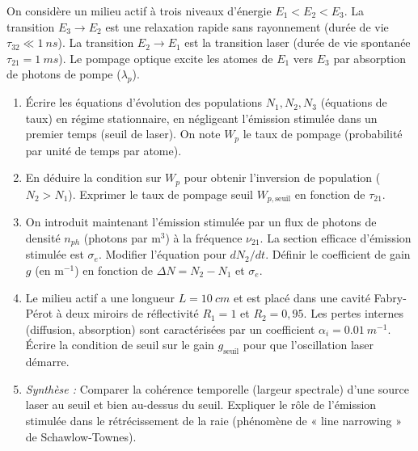 \documentclass[11pt]{article}
\begin{document}
\begin{exercice}
On considère un milieu actif à trois niveaux d'énergie $E_1 < E_2 < E_3$. La transition $E_3 \to E_2$ est une relaxation rapide sans rayonnement (durée de vie $\tau_{32} \ll \SI{1}{ns}$). La transition $E_2 \to E_1$ est la transition laser (durée de vie spontanée $\tau_{21} = \SI{1}{ms}$). Le pompage optique excite les atomes de $E_1$ vers $E_3$ par absorption de photons de pompe ($\lambda_p$).
\begin{enumerate}
    \item Écrire les équations d'évolution des populations $N_1, N_2, N_3$ (équations de taux) en régime stationnaire, en négligeant l'émission stimulée dans un premier temps (seuil de laser). On note $W_p$ le taux de pompage (probabilité par unité de temps par atome).
    \item En déduire la condition sur $W_p$ pour obtenir l'inversion de population ($N_2 > N_1$). Exprimer le taux de pompage seuil $W_{p,\text{seuil}}$ en fonction de $\tau_{21}$.
    \item On introduit maintenant l'émission stimulée par un flux de photons de densité $n_{ph}$ (photons par $\text{m}^3$) à la fréquence $\nu_{21}$. La section efficace d'émission stimulée est $\sigma_e$. Modifier l'équation pour $dN_2/dt$. Définir le coefficient de gain $g$ (en $\text{m}^{-1}$) en fonction de $\Delta N = N_2 - N_1$ et $\sigma_e$.
    \item Le milieu actif a une longueur $L = \SI{10}{cm}$ et est placé dans une cavité Fabry-Pérot à deux miroirs de réflectivité $R_1 = 1$ et $R_2 = 0,95$. Les pertes internes (diffusion, absorption) sont caractérisées par un coefficient $\alpha_i = \SI{0,01}{m^{-1}}$. Écrire la condition de seuil sur le gain $g_{\text{seuil}}$ pour que l'oscillation laser démarre.
    \item \textit{Synthèse :} Comparer la cohérence temporelle (largeur spectrale) d'une source laser au seuil et bien au-dessus du seuil. Expliquer le rôle de l'émission stimulée dans le rétrécissement de la raie (phénomène de « line narrowing » de Schawlow-Townes).
\end{enumerate}
\end{exercice}
\end{document}
